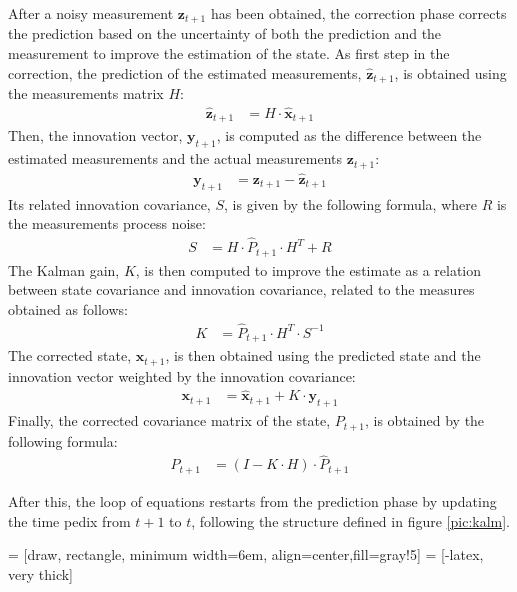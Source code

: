 After a noisy measurement $\mathbf{z}_{t+1}$ has been obtained, the correction phase corrects the prediction based on the uncertainty of both the prediction and the measurement to improve the estimation of the state.
As first step in the correction, the prediction of the estimated measurements, $\hat{\mathbf{z}}_{t+1}$, is obtained using the measurements matrix $H$:
    \begin{align}
    \hat{\mathbf{z}}_{t+1} & = H \cdot \hat{\mathbf{x}}_{t+1}
    \label{eq:pred-measure}
    \end{align}
Then, the innovation vector, $\mathbf{y}_{t+1}$, is computed as the difference between the estimated measurements and the actual measurements $\mathbf{z}_{t+1}$:
    \begin{align}
    \mathbf{y}_{t+1} & = \mathbf{z}_{t+1} - \hat{\mathbf{z}}_{t+1}
    \end{align}
Its related innovation covariance, $S$, is given by the following formula, where $R$ is the measurements process noise:
    \begin{align}
    S & = H \cdot \hat{P}_{t+1} \cdot H^T + R
    \end{align}
The Kalman gain, $K$, is then computed to improve the estimate as a relation between state covariance and innovation covariance, related to the measures obtained as follows:
    \begin{align}
    K & = \hat{P}_{t+1} \cdot H^T \cdot S^{-1}
    \end{align}
The corrected state, $\mathbf{x}_{t+1}$, is then obtained using the predicted state and the innovation vector weighted by the innovation covariance:
    \begin{align}
    \mathbf{x}_{t+1} & = \hat{\mathbf{x}}_{t+1} + K \cdot \mathbf{y}_{t+1}
    \end{align}
Finally, the corrected covariance matrix of the state, $P_{t+1}$, is obtained by the following formula:
    \begin{align}
    P_{t+1} & = (I - K \cdot H) \cdot \hat{P}_{t+1}
    \end{align}

After this, the loop of equations restarts from the prediction phase by updating the time pedix from $t+1$ to $t$, following the structure defined in figure \ref{pic:kalm}.

 = [draw, rectangle, minimum width=6em, align=center,fill=gray!5]
 = [-latex, very thick]
\newcommand*{\tran}{\top}

